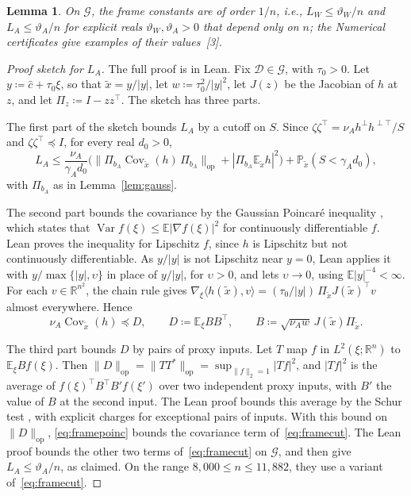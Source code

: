 \documentclass[10pt]{article}
\newcommand{\leanmark}[1]{{\relscale{0.78}\color{gray}[#1]}}
\newtheorem{lemma}{Lemma}
\newcommand{\RR}{\mathbb{R}}
\newcommand{\Dd}{\mathcal{D}}\newcommand{\Ee}{\mathcal{E}}
\newcommand{\Gg}{\mathcal{G}}\newcommand{\Hh}{\mathcal{H}}
\newcommand{\EE}{\mathbb{E}}
\newcommand{\PP}{\mathbb{P}}
\newcommand{\chat}{\hat c}
\begin{document}
\begin{lemma}\label{lem:frame}
  On $\Gg$, the frame constants are of order $1/n$, i.e., $L_W\le \vartheta_W/n$
  and $L_A\le \vartheta_A/n$ for explicit reals $\vartheta_W,\vartheta_A>0$
  that depend only on $n$; the Numerical certificates give examples of
  their values~\leanmark{3}.
\end{lemma}
\begin{proof}[Proof sketch for $L_A$]
The full proof is in Lean. Fix $\Dd\in\Gg$, with $\tau_0>0$. Let
$y\coloneqq\chat+\tau_0\xi$, so that $\tilde x=y/|y|$, let
$w\coloneqq\tau_0^2/|y|^2$, let $J(z)$ be the Jacobian of $h$ at $z$, and let
$\Pi_z\coloneqq I-zz^\top$. The sketch has three parts.

The first part of the sketch bounds $L_A$ by a cutoff on $S$. Since $\zeta\zeta^\top=\nu_Ah^\perp h^{\perp\top}/S$
and $\zeta\zeta^\top\preceq I$, for every real $d_0>0$,
\begin{equation}\label{eq:framecut}
L_A\le\frac{\nu_A}{\gamma_Ad_0}\bigl(\|\Pi_{b_A}\operatorname{Cov}_{\tilde x}(h)\,\Pi_{b_A}\|_{\mathrm{op}}
+|\Pi_{b_A}\EE_{\tilde x}h|^2\bigr)+\PP_{\tilde x}(S<\gamma_Ad_0),
\end{equation}
with $\Pi_{b_A}$ as in Lemma~\ref{lem:gauss}.

The second part bounds the covariance by the Gaussian Poincar\'e inequality
\citep[Theorem~3.20]{blm-2013}, which states that
$\operatorname{Var}f(\xi)\le\EE|\nabla f(\xi)|^2$ for continuously
differentiable $f$. Lean proves the inequality for Lipschitz $f$, since $h$ is
Lipschitz but not continuously differentiable. As $y/|y|$ is not Lipschitz
near $y=0$, Lean applies it with $y/\max\{|y|,\upsilon\}$ in place of $y/|y|$,
for $\upsilon>0$, and lets $\upsilon\to0$, using $\EE|y|^{-4}<\infty$. For each $v\in\RR^{n^2}$, the chain rule gives
$\nabla_\xi\langle h(\tilde x),v\rangle=(\tau_0/|y|)\,\Pi_{\tilde x}J(\tilde x)^\top v$
almost everywhere. Hence
\begin{equation}\label{eq:framepoinc}
\nu_A\operatorname{Cov}_{\tilde x}(h)\preceq D,\qquad D\coloneqq\EE_\xi BB^\top,\qquad
B\coloneqq\sqrt{\nu_Aw}\,J(\tilde x)\Pi_{\tilde x}.
\end{equation}

The third part bounds $D$ by pairs of proxy inputs. Let $T$ map $f$ in
$L^2(\xi;\RR^n)$ to $\EE_\xi Bf(\xi)$. Then
$\|D\|_{\mathrm{op}}=\|TT^*\|_{\mathrm{op}}=\sup_{\|f\|_2=1}|Tf|^2$, and $|Tf|^2$
is the average of $f(\xi)^\top B^\top B'f(\xi')$ over two independent proxy
inputs, with $B'$ the value of $B$ at the second input. The Lean proof
bounds this average by the Schur test \citep[Theorem~5.2]{halmos-sunder-1978},
with explicit charges for exceptional pairs of inputs. With this bound
on $\|D\|_{\mathrm{op}}$, \eqref{eq:framepoinc} bounds the covariance term
of~\eqref{eq:framecut}. The Lean proof bounds
the other two terms of~\eqref{eq:framecut} on $\Gg$, and then give
$L_A\le\vartheta_A/n$, as claimed. On the range $8{,}000\le n\le11{,}882$,
they use a variant of~\eqref{eq:framecut}.
\end{proof}
\end{document}
